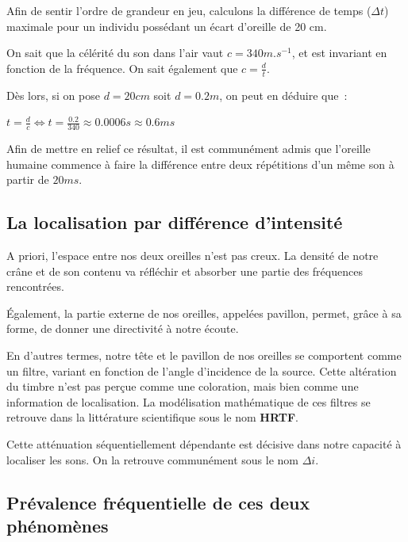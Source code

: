 \documentclass[
]{book}
\begin{document}
Afin de sentir l'ordre de grandeur en jeu, calculons la différence de temps (\(\Delta t\)) maximale pour un individu possédant un écart d'oreille de 20 cm.

On sait que la célérité du son dans l'air vaut \(c = 340 m.s^{-1}\), et est invariant en fonction de la fréquence. On sait également que \(c = \frac{d}{t}\).

Dès lors, si on pose \(d = 20 cm\) soit \(d = 0.2 m\), on peut en déduire que~:

\(t = \frac{d}{c} \iff t= \frac{0.2}{340} \approx 0.0006 s \approx 0.6 ms\)

Afin de mettre en relief ce résultat, il est communément admis que l'oreille humaine commence à faire la différence entre deux répétitions d'un même son à partir de \(20 ms\).

\hypertarget{la-localisation-par-diffuxe9rence-dintensituxe9}{%
\subsection{La localisation par différence d'intensité}\label{la-localisation-par-diffuxe9rence-dintensituxe9}}

A priori, l'espace entre nos deux oreilles n'est pas creux. La densité de notre crâne et de son contenu va réfléchir et absorber une partie des fréquences rencontrées.

Également, la partie externe de nos oreilles, appelées pavillon, permet, grâce à sa forme, de donner une directivité à notre écoute.

En d'autres termes, notre tête et le pavillon de nos oreilles se comportent comme un filtre, variant en fonction de l'angle d'incidence de la source. Cette altération du timbre n'est pas perçue comme une coloration, mais bien comme une information de localisation. La modélisation mathématique de ces filtres se retrouve dans la littérature scientifique sous le nom \textbf{HRTF}.

Cette atténuation séquentiellement dépendante est décisive dans notre capacité à localiser les sons. On la retrouve communément sous le nom \(\Delta i\).

\hypertarget{pruxe9valence-fruxe9quentielle-de-ces-deux-phuxe9nomuxe8nes}{%
\subsection{Prévalence fréquentielle de ces deux phénomènes}\label{pruxe9valence-fruxe9quentielle-de-ces-deux-phuxe9nomuxe8nes}}
\end{document}
